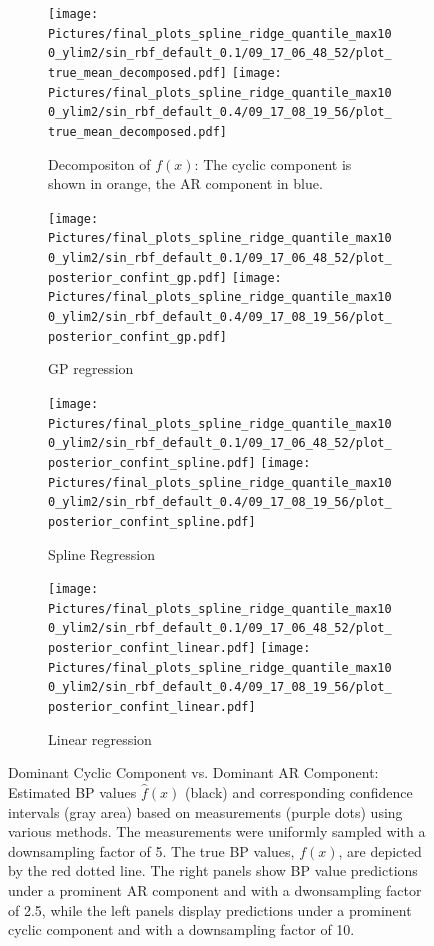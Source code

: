 \begin{figure}
    \centering

\begin{subfigure}{\textwidth}
    \centering
    \texttt{[image: 
    Pictures/final\_plots\_spline\_ridge\_quantile\_max100\_ylim2/sin\_rbf\_default\_0.1/09\_17\_06\_48\_52/plot\_true\_mean\_decomposed.pdf]}
    \texttt{[image: 
    Pictures/final\_plots\_spline\_ridge\_quantile\_max100\_ylim2/sin\_rbf\_default\_0.4/09\_17\_08\_19\_56/plot\_true\_mean\_decomposed.pdf]}
  \caption{Decompositon of $f(x)$: The cyclic component is shown in orange, the AR component in blue.}
\end{subfigure}

\begin{subfigure}{\textwidth}
    \centering
    \texttt{[image: 
    Pictures/final\_plots\_spline\_ridge\_quantile\_max100\_ylim2/sin\_rbf\_default\_0.1/09\_17\_06\_48\_52/plot\_posterior\_confint\_gp.pdf]}
    \texttt{[image: 
        Pictures/final\_plots\_spline\_ridge\_quantile\_max100\_ylim2/sin\_rbf\_default\_0.4/09\_17\_08\_19\_56/plot\_posterior\_confint\_gp.pdf]}
  \caption{GP regression}
\end{subfigure}\hfill

\begin{subfigure}{\textwidth}
    \centering
    \texttt{[image: 
    Pictures/final\_plots\_spline\_ridge\_quantile\_max100\_ylim2/sin\_rbf\_default\_0.1/09\_17\_06\_48\_52/plot\_posterior\_confint\_spline.pdf]}
    \texttt{[image: 
        Pictures/final\_plots\_spline\_ridge\_quantile\_max100\_ylim2/sin\_rbf\_default\_0.4/09\_17\_08\_19\_56/plot\_posterior\_confint\_spline.pdf]}
  \caption{Spline Regression }
\end{subfigure}

\begin{subfigure}{\textwidth}
    \centering
    \texttt{[image: 
    Pictures/final\_plots\_spline\_ridge\_quantile\_max100\_ylim2/sin\_rbf\_default\_0.1/09\_17\_06\_48\_52/plot\_posterior\_confint\_linear.pdf]}
    \texttt{[image: 
        Pictures/final\_plots\_spline\_ridge\_quantile\_max100\_ylim2/sin\_rbf\_default\_0.4/09\_17\_08\_19\_56/plot\_posterior\_confint\_linear.pdf]}
  \caption{Linear regression }
\end{subfigure}


\caption[Dominant Cyclic Component vs. Dominant AR Component]{
Dominant Cyclic Component vs. Dominant AR Component:
    Estimated BP values $\hat{f}(x)$ (black) and corresponding confidence intervals (gray area)
    based on measurements (purple dots) using various methods.
    The measurements were uniformly sampled with a downsampling factor of 5.
    The true BP values, $f(x)$, are depicted by the red dotted line.
    The right panels show BP value predictions under a prominent AR component and with a dwonsampling factor of 2.5,
    while the left panels display predictions under a prominent cyclic component and with a downsampling factor of 10.
 }
\label{fig:ex-ar-cyclic}
\end{figure}



